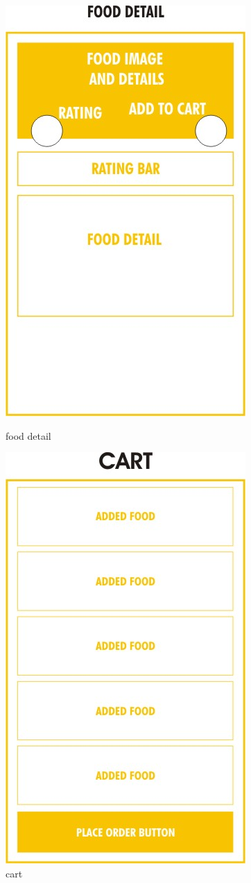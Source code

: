 \documentclass[12pt]{article}
\begin{document}
\begin{figure}
\includegraphics[scale=0.4]{milestone2/2.jpeg}
\caption{food detail}
\includegraphics[scale=0.4]{milestone2/3.jpeg}
\caption{cart}

\end{figure}
\end{document}
